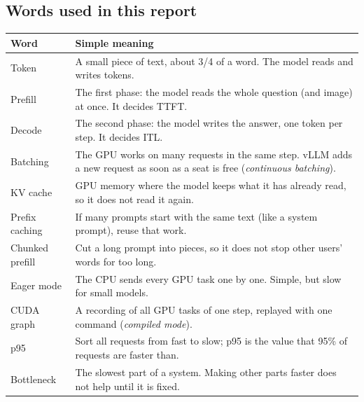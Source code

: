 \documentclass[10pt,a4paper]{article}
\begin{document}
\subsection{Words used in this report}
\begin{center}\small
\begin{tabularx}{\linewidth}{@{}l X@{}}
\toprule
\textbf{Word} & \textbf{Simple meaning} \\
\midrule
Token & A small piece of text, about 3/4 of a word. The model reads and writes tokens. \\
Prefill & The first phase: the model reads the whole question (and image) at once. It decides TTFT. \\
Decode & The second phase: the model writes the answer, one token per step. It decides ITL. \\
Batching & The GPU works on many requests in the same step. vLLM adds a new request as soon as a seat is free (\emph{continuous batching}). \\
KV cache & GPU memory where the model keeps what it has already read, so it does not read it again. \\
Prefix caching & If many prompts start with the same text (like a system prompt), reuse that work. \\
Chunked prefill & Cut a long prompt into pieces, so it does not stop other users' words for too long. \\
Eager mode & The CPU sends every GPU task one by one. Simple, but slow for small models. \\
CUDA graph & A recording of all GPU tasks of one step, replayed with one command (\emph{compiled mode}). \\
p95 & Sort all requests from fast to slow; p95 is the value that 95\% of requests are faster than. \\
Bottleneck & The slowest part of a system. Making other parts faster does not help until it is fixed. \\
\bottomrule
\end{tabularx}
\end{center}
\end{document}
